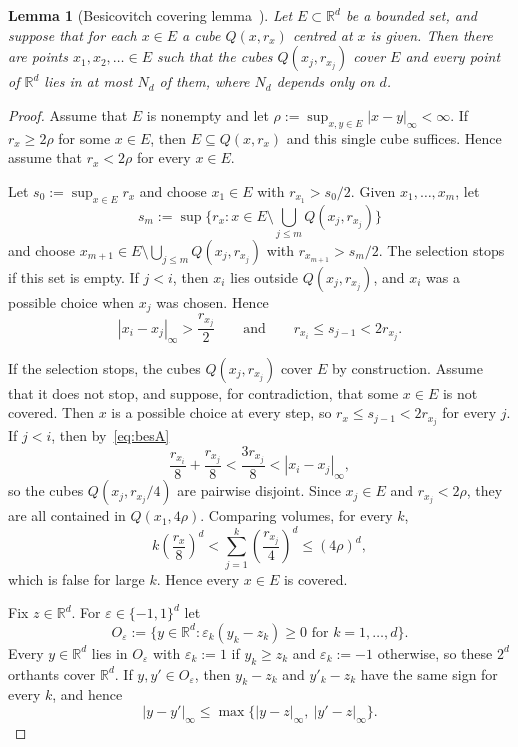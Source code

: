 \documentclass[12pt]{article}
\newtheorem{lemma}{Lemma}
\begin{document}
\begin{lemma}[{Besicovitch covering lemma~\cite[Theorem~1.1]{Guzman1975}}]\label{lem:besicovitch}
Let $E \subset \mathbb{R}^d$ be a bounded set, and suppose that for each $x \in E$ a cube $Q(x, r_x)$ centred at $x$ is given. Then there are points $x_1, x_2, \ldots \in E$ such that the cubes $Q(x_j, r_{x_j})$ cover $E$ and every point of $\mathbb{R}^d$ lies in at most $N_d$ of them, where $N_d$ depends only on $d$.
\end{lemma}

\begin{proof}
Assume that $E$ is nonempty and let $\rho := \sup_{x,y \in E} |x - y|_\infty < \infty$. If $r_x \ge 2\rho$ for some $x \in E$, then $E \subseteq Q(x, r_x)$ and this single cube suffices. Hence assume that $r_x < 2\rho$ for every $x \in E$.

Let $s_0 := \sup_{x \in E} r_x$ and choose $x_1 \in E$ with $r_{x_1} > s_0/2$. Given $x_1, \ldots, x_m$, let
\[
  s_m := \sup\Big\{ r_x : x \in E \setminus \bigcup_{j \le m} Q(x_j, r_{x_j}) \Big\}
\]
and choose $x_{m+1} \in E \setminus \bigcup_{j \le m} Q(x_j, r_{x_j})$ with $r_{x_{m+1}} > s_m/2$. The selection stops if this set is empty. If $j < i$, then $x_i$ lies outside $Q(x_j, r_{x_j})$, and $x_i$ was a possible choice when $x_j$ was chosen. Hence
\begin{equation}\label{eq:besA}
  |x_i - x_j|_\infty > \frac{r_{x_j}}{2} \qquad \text{and} \qquad r_{x_i} \le s_{j-1} < 2 r_{x_j} .
\end{equation}

If the selection stops, the cubes $Q(x_j, r_{x_j})$ cover $E$ by construction. Assume that it does not stop, and suppose, for contradiction, that some $x \in E$ is not covered. Then $x$ is a possible choice at every step, so $r_x \le s_{j-1} < 2r_{x_j}$ for every $j$. If $j < i$, then by~\eqref{eq:besA}
\[
  \frac{r_{x_i}}{8} + \frac{r_{x_j}}{8} < \frac{3 r_{x_j}}{8} < |x_i - x_j|_\infty ,
\]
so the cubes $Q(x_j, r_{x_j}/4)$ are pairwise disjoint. Since $x_j \in E$ and $r_{x_j} < 2\rho$, they are all contained in $Q(x_1, 4\rho)$. Comparing volumes, for every $k$,
\[
  k \left( \frac{r_x}{8} \right)^d < \sum_{j=1}^k \left( \frac{r_{x_j}}{4} \right)^d \le (4\rho)^d ,
\]
which is false for large $k$. Hence every $x \in E$ is covered.

Fix $z \in \mathbb{R}^d$. For $\varepsilon \in \{-1, 1\}^d$ let
\[
  O_\varepsilon := \{ y \in \mathbb{R}^d : \varepsilon_k (y_k - z_k) \ge 0 \text{ for } k = 1, \ldots, d \}.
\]
Every $y \in \mathbb{R}^d$ lies in $O_\varepsilon$ with $\varepsilon_k := 1$ if $y_k \ge z_k$ and $\varepsilon_k := -1$ otherwise, so these $2^d$ orthants cover $\mathbb{R}^d$. If $y, y' \in O_\varepsilon$, then $y_k - z_k$ and $y'_k - z_k$ have the same sign for every $k$, and hence
\begin{equation}\label{eq:orthant}
  |y - y'|_\infty \le \max\{ |y - z|_\infty,\ |y' - z|_\infty \} .
\end{equation}


\end{proof}
\end{document}
